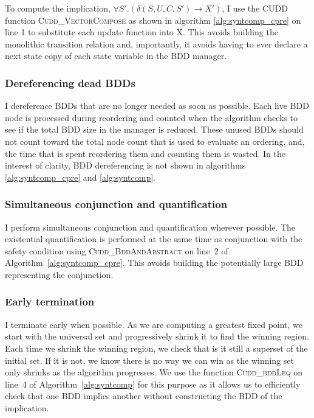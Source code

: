 To compute the implication, $\forall S'. (\delta(S, U, C, S') \rightarrow X')$, I use the CUDD function \textsc{Cudd\_VectorCompose} as shown in algorithm \ref{alg:syntcomp_cpre} on line 1 to substitute each update function into X. This avoids building the monolithic transition relation and, importantly, it avoids having to ever declare a next state copy of each state variable in the BDD manager. 

\subsubsection{Dereferencing dead BDDs}
I dereference BDDs that are no longer needed as soon as possible. Each live BDD node is processed during reordering and counted when the algorithm checks to see if the total BDD size in the manager is reduced. These unused BDDs should not count toward the total node count that is used to evaluate an ordering, and, the time that is spent reordering them and counting them is wasted. In the interest of clarity, BDD dereferencing is not shown in algorithms \ref{alg:syntcomp_cpre} and \ref{alg:syntcomp}.

\subsubsection{Simultaneous conjunction and quantification}
I perform simultaneous conjunction and quantification wherever possible. The existential quantification is performed at the same time as conjunction with the safety condition using \textsc{Cudd\_BddAndAbstract} on line~2 of Algorithm~\ref{alg:syntcomp_cpre}. This avoids building the potentially large BDD representing the conjunction.

\subsubsection{Early termination}
I terminate early when possible. As we are computing a greatest fixed point, we start with the universal set and progressively shrink it to find the winning region. Each time we shrink the winning region, we check that is it still a superset of the initial set. If it is not, we know there is no way we can win as the winning set only shrinks as the algorithm progresses. We use the function \textsc{Cudd\_bddLeq} on line~4 of Algorithm~\ref{alg:syntcomp} for this purpose as it allows us to efficiently check that one BDD implies another without constructing the BDD of the implication.

